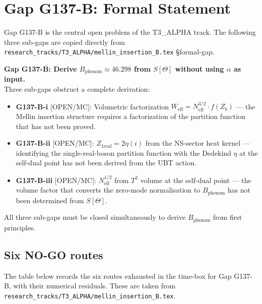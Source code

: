\documentclass[12pt,a4paper]{article}
\theoremstyle{definition}
\theoremstyle{remark}
\begin{document}
\section{Gap G137-B: Formal Statement}
\label{sec:gap}

Gap G137-B is the central open problem of the T3\_ALPHA track.  The following
three sub-gaps are copied directly from
\texttt{research\_tracks/T3\_ALPHA/mellin\_insertion\_B.tex} §formal-gap.

\begin{gapbox}
\textbf{Gap G137-B: Derive $B_{\mathrm{phenom}} \approx 46.298$ from $S[\Theta]$
without using $\alpha$ as input.}\\[6pt]
Three sub-gaps obstruct a complete derivation:
\begin{itemize}
\item \textbf{G137-B-i} [OPEN/MC]: Volumetric factorization
  $W_{\mathrm{eff}} = N_{\mathrm{eff}}^{3/2}\cdot f(Z_b)$ — the Mellin
  insertion structure requires a factorization of the partition function
  that has not been proved.
\item \textbf{G137-B-ii} [OPEN/MC]: $Z_{1\mathrm{real}} = 2\eta(i)$ from the
  NS-sector heat kernel — identifying the single-real-boson partition function
  with the Dedekind $\eta$ at the self-dual point has not been derived from the
  UBT action.
\item \textbf{G137-B-iii} [OPEN/MC]: $N_{\mathrm{eff}}^{1/2}$ from $T^3$ volume
  at the self-dual point — the volume factor that converts the zero-mode
  normalisation to $B_{\mathrm{phenom}}$ has not been determined from $S[\Theta]$.
\end{itemize}
All three sub-gaps must be closed simultaneously to derive $B_{\mathrm{phenom}}$
from first principles.
\end{gapbox}

\subsection{Six NO-GO routes}

The table below records the six routes exhausted in the time-box for Gap G137-B,
with their numerical residuals.  These are taken from
\texttt{research\_tracks/T3\_ALPHA/mellin\_insertion\_B.tex}.
\end{document}
